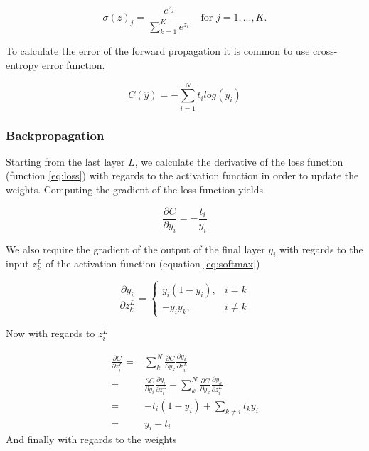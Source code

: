 \documentclass[thesis.tex]{subfiles}
\begin{document}
\begin{equation} %
  \sigma(z)_j = \frac{e^{z_j}}{\sum_{k=1}^{K} e^{z_k}} \quad \text{for } j = 1, ..., K.
  \label{eq:softmax}
\end{equation}

To calculate the error of the forward propagation it is common to use cross-entropy error function.

\begin{equation} %
  C(\hat{y}) = - \sum_{i=1}^N t_i log(y_i)
  \label{eq:loss}
\end{equation}


\subsubsection{Backpropagation}
Starting from the last layer $L$, we calculate the derivative of the loss function (function \ref{eq:loss}) with regards to the activation function in order to update the weights. Computing the gradient of the loss function yields

\begin{equation}
  \frac{\partial C}{\partial y_i} = - \frac{t_i}{y_i}
\end{equation}

We also require the gradient of the output of the final layer $y_i$ with regards to the input $z_k^L$ of the activation function (equation \ref{eq:softmax})

\begin{equation}
  \frac{\partial y_i}{\partial z_k^L} = 
  \begin{cases}
      y_i(1 - y_i), & i = k\\
      -y_iy_k, & i \ne k
  \end{cases}
\end{equation}

Now with regards to $z_i^L$

\begin{equation}
  \begin{aligned}
  \frac{\partial C}{\partial z_i^L} = & \sum_k^N \frac{\partial C}{\partial y_k}\frac{\partial y_k}{\partial z_i^L} \\
  = & \frac{\partial C}{\partial y_i}\frac{\partial y_i}{\partial z_i^L} - \sum_k^N \frac{\partial C}{\partial y_k}\frac{\partial y_k}{\partial z_i^L} \\
  = & -t_i(1 - y_i) + \sum_{k \ne i}t_ky_i \\
  = & y_i - t_i
  \end{aligned}
\end{equation}
And finally with regards to the weights
\end{document}
